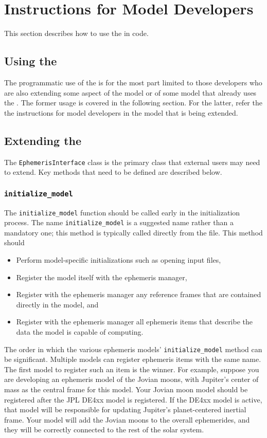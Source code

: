 \section{Instructions for Model Developers}
This section describes how to use the \ModelDesc
in \Cplusplus code.

\label{sec:guide_model_developers}
\subsection{Using the \ModelDesc}
The programmatic use of the \ModelDesc is for the most part limited
to those developers who are also extending some aspect of the model
or of some model that already uses the \ModelDesc.
The former usage is covered in the following section.
For the latter, refer the the instructions for model developers
in the model that is being extended.

\subsection{Extending the \ModelDesc}
The \verb|EphemerisInterface| class is the primary class that
external users may need to extend. Key methods that need to be
defined are described below.



\subsubsection{\texttt{initialize\_model}}
The \texttt{initialize\_model} function should be called early in the
initialization process.
The name \texttt{initialize\_model} is a suggested name
rather than a mandatory one;
this method is typically called directly from the
\Sdefine file. This method should\begin{itemize}
\item Perform model-specific initializations such as opening input files,
\item Register the model itself with the ephemeris manager,
\item Register with the ephemeris manager any reference frames that are
  contained directly in the model, and
\item Register with the ephemeris manager all ephemeris items that
  describe the data the model is capable of computing.
\end{itemize}
The order in which the various ephemeris models'
\texttt{initialize\_model} method can be significant.
Multiple models can register ephemeris items with the same name.
The first model to register such an item is the winner.
For example, suppose you are developing an ephemeris model of the Jovian
moons, with Jupiter's center of mass as the central frame for this model.
Your Jovian moon model should be registered after the JPL DE4xx model
is registered. If the DE4xx model is active, that model will be responsible for
updating Jupiter's planet-centered inertial frame. Your model will add
the Jovian moons to the overall ephemerides, and they will be correctly
connected to the rest of the solar system.

